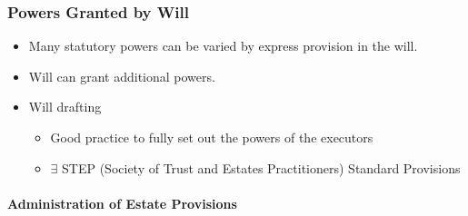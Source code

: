 \documentclass[
]{article}
\providecommand{\tightlist}{%
  \setlength{\itemsep}{0pt}\setlength{\parskip}{0pt}}
\begin{document}
\hypertarget{powers-granted-by-will}{%
\subsubsection{Powers Granted by Will}\label{powers-granted-by-will}}

\begin{itemize}
\tightlist
\item
  Many statutory powers can be varied by express provision in the will.
\item
  Will can grant additional powers.
\item
  Will drafting

  \begin{itemize}
  \tightlist
  \item
    Good practice to fully set out the powers of the executors
  \item
    \(\exists\) STEP (Society of Trust and Estates Practitioners)
    Standard Provisions
  \end{itemize}
\end{itemize}

\hypertarget{administration-of-estate-provisions}{%
\paragraph{Administration of Estate
Provisions}\label{administration-of-estate-provisions}}
\end{document}
